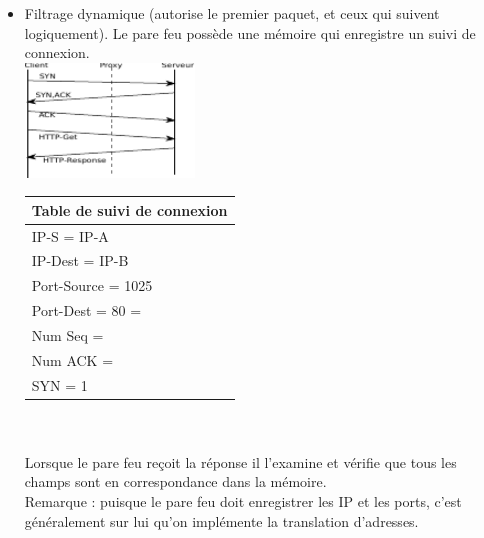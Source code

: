 \begin{itemize}
		\item Filtrage dynamique (autorise le premier paquet, et ceux qui suivent logiquement). Le pare feu possède une mémoire qui enregistre un suivi de connexion. \\ 
		\includegraphics[width=170px]{Images/19_FiltrageDynamique.pdf}
		\begin{tabular}{|l|} \hline
			Table de suivi de connexion \\ \hline
			IP-S = IP-A \\ \hline
			IP-Dest = IP-B \\ \hline
			Port-Source = 1025 \\ \hline
			Port-Dest = 80 = \\ \hline
			Num Seq = \\ \hline
			Num ACK = \\ \hline
			SYN = 1 \\ \hline
		\end{tabular} \\ \\
		Lorsque le pare feu reçoit la réponse il l'examine et vérifie que tous les champs sont en correspondance dans la mémoire. \\
		Remarque : puisque le pare feu doit enregistrer les IP et les ports, c'est généralement sur lui qu'on implémente la translation d'adresses. 

	\end{itemize}

